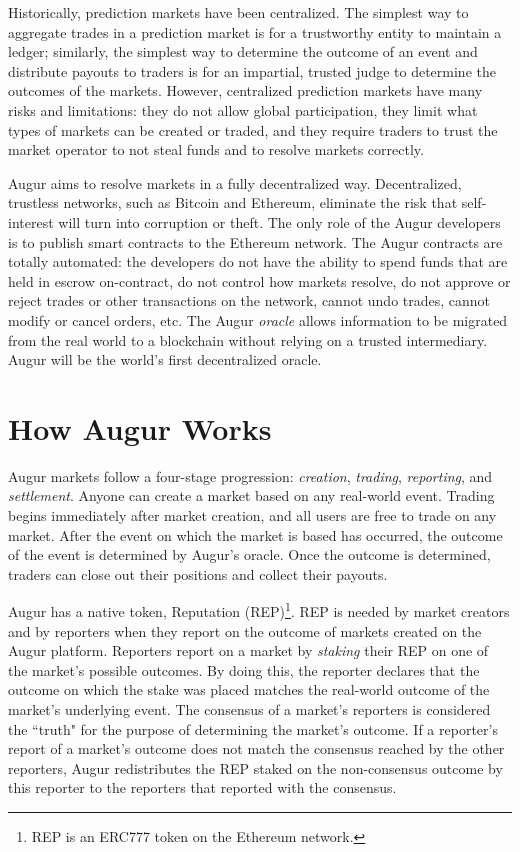 \documentclass[floatfix,reprint,nofootinbib,amsmath,amssymb,epsfig,pre,floats,letterpaper,groupedaffiliation]{revtex4-1}
\theoremstyle{definition}
\theoremstyle{definition}
\begin{document}
Historically, prediction markets have been centralized.  The simplest way to aggregate trades in a prediction market is for a trustworthy entity to maintain a ledger; similarly, the simplest way to determine the outcome of an event and distribute payouts to traders is for an impartial, trusted judge to determine the outcomes of the markets.  However, centralized prediction markets have many risks and limitations: they do not allow global participation, they limit what types of markets can be created or traded, and they require traders to trust the market operator to not steal funds and to resolve markets correctly.

Augur aims to resolve markets in a fully decentralized way.  Decentralized, trustless networks, such as Bitcoin\cite{Nakamoto_2008} and Ethereum\cite{Buterin_2013}, eliminate the risk that self-interest will turn into corruption or theft.  The only role of the Augur developers is to publish smart contracts to the Ethereum network.  The Augur contracts are totally automated: the developers do not have the ability to spend funds that are held in escrow on-contract, do not control how markets resolve, do not approve or reject trades or other transactions on the network, cannot undo trades, cannot modify or cancel orders, etc.  The Augur \textit{oracle} allows information to be migrated from the real world to a blockchain without relying on a trusted intermediary.  Augur will be the world's first decentralized oracle.

\section{How Augur Works}
Augur markets follow a four-stage progression: \textit{creation}, \textit{trading}, \textit{reporting}, and \textit{settlement}.  Anyone can create a market based on any real-world event.  Trading begins immediately after market creation, and all users are free to trade on any market.  After the event on which the market is based has occurred, the outcome of the event is determined by Augur's oracle.  Once the outcome is determined, traders can close out their positions and collect their payouts.

Augur has a native token, Reputation (REP)\footnote{REP is an ERC777 token on the Ethereum network.}.  REP is needed by market creators and by reporters when they report on the outcome of markets created on the Augur platform.  Reporters report on a market by \textit{staking} their REP on one of the market's possible outcomes.  By doing this, the reporter declares that the outcome on which the stake was placed matches the real-world outcome of the market's underlying event.  The consensus of a market's reporters is considered the ``truth" for the purpose of determining the market's outcome.  If a reporter's report of a market's outcome does not match the consensus reached by the other reporters, Augur redistributes the REP staked on the non-consensus outcome by this reporter to the reporters that reported with the consensus.
\end{document}
